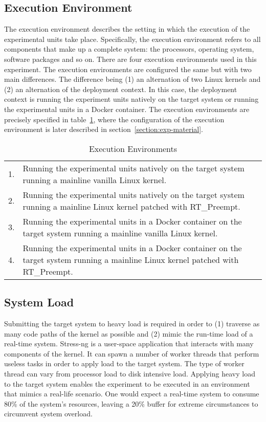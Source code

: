 \subsection{Execution Environment}
The execution environment describes the setting in which the execution of the experimental units take place. Specifically, the execution environment refers to all components that make up a complete system: the processors, operating system, software packages and so on. There are four execution environments used in this experiment. The execution environments are configured the same but with two main differences. The difference being (1) an alternation of two Linux kernels and (2) an alternation of the deployment context. In this case, the deployment context is running the experiment units natively on the target system or running the experimental units in a Docker container. The execution environments are precisely specified in table~\ref{table:exe-env}, where the configuration of the execution environment is later described in section~\ref{section:exp-material}.


\begin{table}[ht]
\begin{tabular}{l|p{14cm}}
1. & Running the experimental units natively on the target system running a mainline vanilla Linux kernel.                               \\
2. & Running the experimental units natively on the target system running a mainline Linux kernel patched with RT\_Preempt.              \\
3. & Running the experimental units in a Docker container on the target system running a mainline vanilla Linux kernel.                  \\
4. & Running the experimental units in a Docker container on the target system running a mainline Linux kernel patched with RT\_Preempt.
\end{tabular}
\centering
\caption{Execution Environments}
\label{table:exe-env}
\end{table}


\subsection{System Load}
Submitting the target system to heavy load is required in order to (1) traverse as many code paths of the kernel as possible and (2) mimic the run-time load of a real-time system. Stress-ng \cite{stress-ng} is a user-space application that interacts with many components of the kernel. It can spawn a number of worker threads that perform useless tasks in order to apply load to the target system. The type of worker thread can vary from processor load to disk intensive load. Applying heavy load to the target system enables the experiment to be executed in an environment that mimics a real-life scenario. One would expect a real-time system to consume 80\% of the system's resources, leaving a 20\% buffer for extreme circumstances to circumvent system overload. \\

